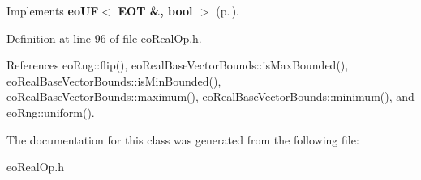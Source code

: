 Implements {\bf eo\-UF$<$ EOT \&, bool $>$} {\rm (p.\,\pageref{classeo_u_f_a1})}.

Definition at line 96 of file eo\-Real\-Op.h.

References eo\-Rng::flip(), eo\-Real\-Base\-Vector\-Bounds::is\-Max\-Bounded(), eo\-Real\-Base\-Vector\-Bounds::is\-Min\-Bounded(), eo\-Real\-Base\-Vector\-Bounds::maximum(), eo\-Real\-Base\-Vector\-Bounds::minimum(), and eo\-Rng::uniform().

The documentation for this class was generated from the following file:\begin{CompactItemize}
\item 
eo\-Real\-Op.h\end{CompactItemize}

